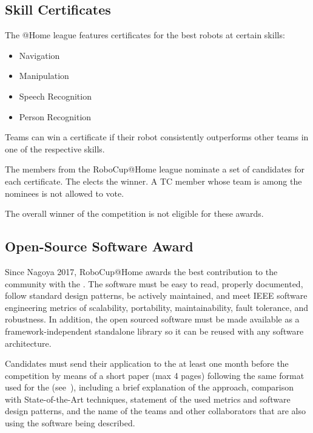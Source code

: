 \subsection{Skill Certificates}
\label{award:skill}
The @Home league features certificates for the best robots at certain skills:
\begin{itemize}
   \item Navigation
   \item Manipulation
   \item Speech Recognition
   \item Person Recognition
  \end{itemize}

Teams can win a certificate if their robot consistently outperforms other teams 
in one of the respective skills.

The  members from the RoboCup@Home league 
nominate a set of candidates for each certificate. The  elects the winner. A TC member whose team is among the nominees 
is not allowed to vote.

The overall winner of the competition is not eligible for these awards.

\subsection{Open-Source Software Award}
\label{award:oss}
Since Nagoya 2017, RoboCup@Home awards the best contribution to the community 
with the . The software must be easy to read, 
properly documented, follow standard design patterns, be actively maintained, 
and meet IEEE software engineering metrics of scalability, portability, 
maintainability, fault tolerance, and robustness. In addition, the open sourced 
software must be made available as a framework-independent standalone library 
so it can be reused with any software architecture.

Candidates must send their application to the  at least one month before the competition by means of a short paper (max 4 pages) following the same format used for the  (see~), including a brief explanation of the approach, comparison with State-of-the-Art techniques, statement of the used metrics and software design patterns, and the name of the teams and other collaborators that are also using the software being described.

